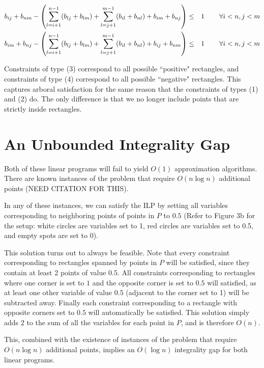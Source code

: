 \documentclass[11pt]{article}
\begin{document}
\begin{align}
b_{ij} + b_{nm} - \left(\sum_{l=i+1}^{n-1} (b_{lj}+b_{lm}) + \sum_{l=j+1}^{m-1} (b_{il} + b_{nl}) + b_{im} + b_{nj} \right) &\leq& 1 & \hspace{.3in} \forall i<n, j<m \\
b_{im} + b_{nj} - \left(\sum_{l=i+1}^{n-1} (b_{lj}+b_{lm}) + \sum_{l=j+1}^{m-1} (b_{il} + b_{nl}) + b_{ij} + b_{nm} \right) &\leq& 1 & \hspace{.3in} \forall i<n, j<m
\end{align}

Constraints of type (3) correspond to all possible ``positive" rectangles, and constraints of type (4) correspond to all possible ``negative" rectangles. This captures arboral satisfaction for the same reason that the constraints of types (1) and (2) do. The only difference is that we no longer include points that are strictly inside rectangles.

\section{An Unbounded Integrality Gap}

Both of these linear programs will fail to yield $O(1)$ approximation algorithms. There are known instances of the problem that require $O(n\log n)$ additional points (NEED CITATION FOR THIS). 

In any of these instances, we can satisfy the ILP by setting all variables corresponding to neighboring points of points in $P$ to $0.5$ (Refer to Figure 3b for the setup: white circles are variables set to 1, red circles are variables set to 0.5, and empty spots are set to 0).

This solution turns out to always be feasible. Note that every constraint corresponding to rectangles spanned by points in $P$ will be satisfied, since they contain at least 2 points of value $0.5$. All constraints corresponding to rectangles where one corner is set to $1$ and the opposite corner is set to $0.5$ will satisfied, as at least one other variable of value $0.5$ (adjacent to the corner set to 1) will be subtracted away. Finally each constraint corresponding to a rectangle with opposite corners set to $0.5$ will automatically be satisfied. This solution simply adds 2 to the sum of all the variables for each point in $P$, and is therefore $O(n)$. 

This, combined with the existence of instances of the problem that require $O(n\log n)$ additional points, implies an $O(\log n)$ integrality gap for both linear programs.
\end{document}
